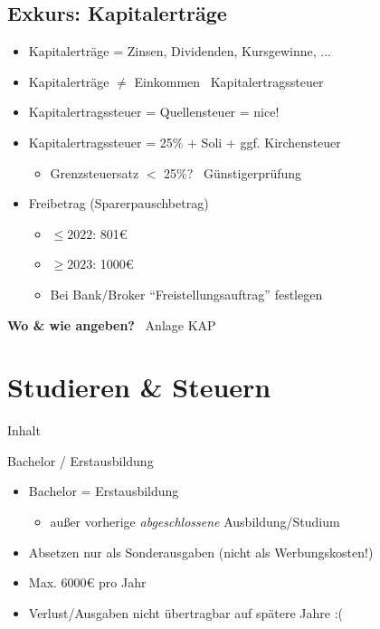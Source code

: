 \documentclass{beamer}
\begin{document}
		\subsection{Exkurs: Kapitalerträge}
		
			\begin{frame}
				\begin{itemize}
					\item Kapitalerträge = Zinsen, Dividenden, Kursgewinne, ...
					\item Kapitalerträge $\neq$ Einkommen \textrightarrow\ Kapitalertragssteuer\pause
					\item Kapitalertragssteuer = Quellensteuer = nice!
					\item Kapitalertragssteuer = 25\% + Soli + ggf. Kirchensteuer
					\begin{itemize}
						\item Grenzsteuersatz $<$ 25\%? \textrightarrow\ Günstigerprüfung
					\end{itemize}\pause
					\item Freibetrag (Sparerpauschbetrag)
					\begin{itemize}
						\item $\leq2022$: 801€
						\item $\geq2023$: 1000€
						\item Bei Bank/Broker "`Freistellungsauftrag"' festlegen
					\end{itemize}
				\end{itemize}\n
				\pause
				\textbf{Wo \& wie angeben?} \textrightarrow\ Anlage KAP
			\end{frame}
		
	\section{Studieren \& Steuern}
	
		\begin{frame}[t]{Inhalt}
		\end{frame}
	
		\begin{frame}{Bachelor / Erstausbildung}
			\begin{itemize}
				\item Bachelor = Erstausbildung
				\begin{itemize}
					\item außer vorherige \textit{abgeschlossene} Ausbildung/Studium
				\end{itemize}
				\item Absetzen nur als Sonderausgaben (nicht als Werbungskosten!)
				\item Max. 6000€ pro Jahr
				\item Verlust/Ausgaben nicht übertragbar auf spätere Jahre :(
			\end{itemize}
		\end{frame}
	
\end{document}
